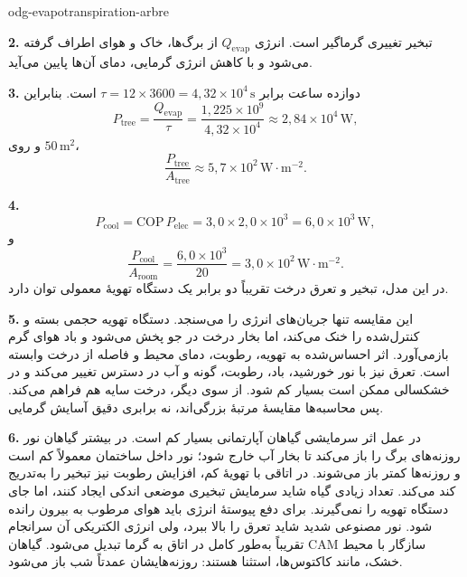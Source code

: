 \begin{exo}{odg-evapotranspiration-arbre}
\begin{solution}
\textbf{2.} تبخیر تغییری گرماگیر است. انرژی $Q_{\mathrm{evap}}$ از برگ‌ها، خاک و هوای اطراف گرفته می‌شود و با کاهش انرژی گرمایی، دمای آن‌ها پایین می‌آید.

\textbf{3.} دوازده ساعت برابر $\tau=12\times3600=4{,}32\times10^4\,\text{s}$ است. بنابراین
\[
P_{\mathrm{tree}}=\frac{Q_{\mathrm{evap}}}{\tau}
=\frac{1{,}225\times10^9}{4{,}32\times10^4}
\approx2{,}84\times10^4\,\text{W},
\]
و روی $50\,\text{m}^2$،
\[
\frac{P_{\mathrm{tree}}}{A_{\mathrm{tree}}}\approx5{,}7\times10^2\,\text{W}\!\cdot\!\text{m}^{-2}.
\]

\textbf{4.}
\[
P_{\mathrm{cool}}=\mathrm{COP}\,P_{\mathrm{elec}}=3{,}0\times2{,}0\times10^3=6{,}0\times10^3\,\text{W},
\]
و
\[
\frac{P_{\mathrm{cool}}}{A_{\mathrm{room}}}=\frac{6{,}0\times10^3}{20}=3{,}0\times10^2\,\text{W}\!\cdot\!\text{m}^{-2}.
\]
در این مدل، تبخیر و تعرق درخت تقریباً دو برابر یک دستگاه تهویهٔ معمولی توان دارد.

\textbf{5.} این مقایسه تنها جریان‌های انرژی را می‌سنجد. دستگاه تهویه حجمی بسته و کنترل‌شده را خنک می‌کند، اما بخار درخت در جو پخش می‌شود و باد هوای گرم بازمی‌آورد. اثر احساس‌شده به تهویه، رطوبت، دمای محیط و فاصله از درخت وابسته است. تعرق نیز با نور خورشید، باد، رطوبت، گونه و آب در دسترس تغییر می‌کند و در خشکسالی ممکن است بسیار کم شود. از سوی دیگر، درخت سایه هم فراهم می‌کند. پس محاسبه‌ها مقایسهٔ مرتبهٔ بزرگی‌اند، نه برابری دقیق آسایش گرمایی.

\textbf{6.} در عمل اثر سرمایشی گیاهان آپارتمانی بسیار کم است. در بیشتر گیاهان نور روزنه‌های برگ را باز می‌کند تا بخار آب خارج شود؛ نور داخل ساختمان معمولاً کم است و روزنه‌ها کمتر باز می‌شوند. در اتاقی با تهویهٔ کم، افزایش رطوبت نیز تبخیر را به‌تدریج کند می‌کند. تعداد زیادی گیاه شاید سرمایش تبخیری موضعی اندکی ایجاد کنند، اما جای دستگاه تهویه را نمی‌گیرند. برای دفع پیوستهٔ انرژی باید هوای مرطوب به بیرون رانده شود. نور مصنوعی شدید شاید تعرق را بالا ببرد، ولی انرژی الکتریکی آن سرانجام تقریباً به‌طور کامل در اتاق به گرما تبدیل می‌شود. گیاهان CAM سازگار با محیط خشک، مانند کاکتوس‌ها، استثنا هستند: روزنه‌هایشان عمدتاً شب باز می‌شود.
\end{solution}
\end{exo}

